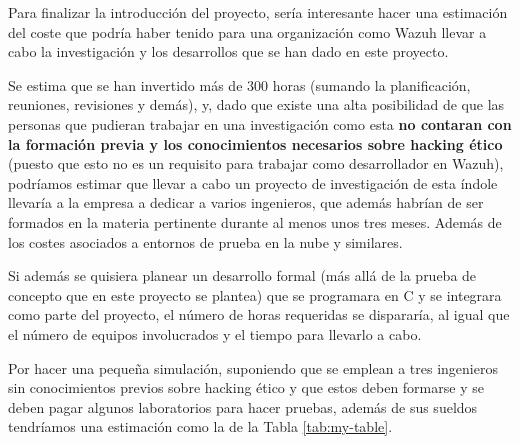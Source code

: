 Para finalizar la introducción del proyecto, sería interesante hacer una estimación del coste que podría haber tenido para una organización como Wazuh llevar a cabo la investigación y los desarrollos que se han dado en este proyecto. 

Se estima que se han invertido más de 300 horas (sumando la planificación, reuniones, revisiones y demás), y, dado que existe una alta posibilidad de que las personas que pudieran trabajar en una investigación como esta \textbf{no contaran con la formación previa y los conocimientos necesarios sobre hacking ético} (puesto que esto no es un requisito para trabajar como desarrollador en Wazuh), podríamos estimar que llevar a cabo un proyecto de investigación de esta índole llevaría a la empresa a dedicar a varios ingenieros, que además habrían de ser formados en la materia pertinente durante al menos unos tres meses. Además de los costes asociados a entornos de prueba en la nube y similares.

Si además se quisiera planear un desarrollo formal (más allá de la prueba de concepto que en este proyecto se plantea) que se programara en C y se integrara como parte del proyecto, el número de horas requeridas se dispararía, al igual que el número de equipos involucrados y el tiempo para llevarlo a cabo.

Por hacer una pequeña simulación, suponiendo que se emplean a tres ingenieros sin conocimientos previos sobre hacking ético y que estos deben formarse y se deben pagar algunos laboratorios para hacer pruebas, además de sus sueldos tendríamos una estimación como la de la Tabla \ref{tab:my-table}.

